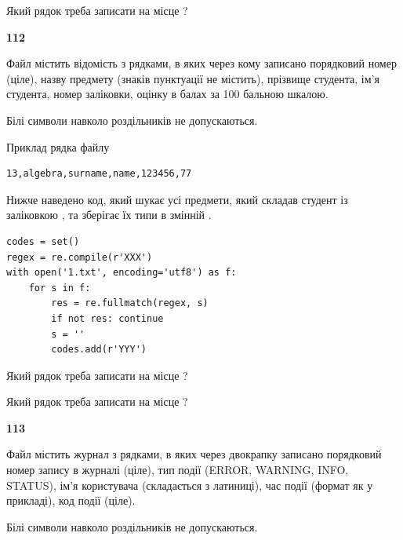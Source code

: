 Який рядок треба записати на місце  ?\par


\newpage

{\begin {center}\textbf{ 112}\end {center}}\par
Файл  містить відомість з рядками, в яких через кому записано поряд\-ковий номер (ціле), назву предмету (знаків пунктуації не містить), прізвище студента, ім'я студента, номер заліковки, оцінку в балах за 100 бальною шкалою.

Білі символи навколо роздільників не допускаються.

Приклад рядка файлу



\begin{verbatim}
13,algebra,surname,name,123456,77
\end{verbatim}


Нижче наведено код, який шукає усі предмети, який складав студент із заліковкою , та зберігає їх типи в змінній .



\begin{verbatim}
codes = set()
regex = re.compile(r'XXX')
with open('1.txt', encoding='utf8') as f:
    for s in f:
        res = re.fullmatch(regex, s)
        if not res: continue
        s = ''
        codes.add(r'YYY')
\end{verbatim}





Який рядок треба записати на місце  ?\par
\vspace{5mm}


Який рядок треба записати на місце  ?\par


\newpage

{\begin {center}\textbf{ 113}\end {center}}\par
Файл  містить журнал з рядками, в яких через двокрапку записано поряд\-ко\-вий номер запису в журналі (ціле), тип події (ERROR, WARNING, INFO, STATUS), ім'я користувача (складається з латиниці), час події (фор\-мат як у прикладі), код події (ціле).

Білі символи навколо роздільників не допускаються.

